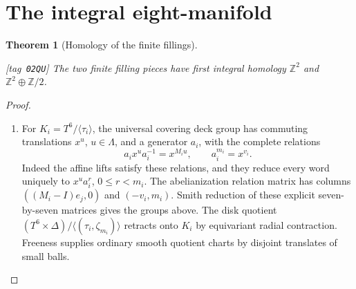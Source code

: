 \documentclass[11pt,a4paper]{article}
\numberwithin{equation}{section}
\newtheorem{theorem}{Theorem}[section]
\theoremstyle{definition}
\newcommand{\StatementRecord}[4]{{\upshape\footnotesize[tag~\texttt{#3}]}\enspace\ignorespaces}
\begin{document}
\section{The integral eight-manifold}\label{pub:V:sec-integral}






  






\begin{theorem}[Homology of the finite fillings]\hypertarget{tag-02QU}{}\label{night:P1.3}
\StatementRecord{night:P1.3}{proved}{02QU}{the definitions and constructions stated in the proof}
The two finite filling pieces have first integral homology
$\mathbb Z^2$ and $\mathbb Z^2\oplus\mathbb Z/2$.
\end{theorem}
\begin{proof}
\begin{enumerate}[label=\arabic*.]
\item For $K_i=T^6/\langle\tau_i\rangle$, the universal covering deck group
has commuting translations $x^u$, $u\in\Lambda$, and a generator $a_i$,
with the complete relations
\[
a_ix^ua_i^{-1}=x^{M_iu},\qquad a_i^{m_i}=x^{v_i}.
\]
Indeed the affine lifts satisfy these relations, and they reduce every
word uniquely to $x^ua_i^r$, $0\leq r<m_i$.
The abelianization relation matrix has columns
$((M_i-I)e_j,0)$ and $(-v_i,m_i)$.
Smith reduction of these explicit seven-by-seven matrices gives the
groups above.  The disk quotient
$(T^6\times\Delta)/\langle(\tau_i,\zeta_{m_i})\rangle$
retracts onto $K_i$ by equivariant radial contraction.  Freeness supplies
ordinary smooth quotient charts by disjoint translates of small balls.

\end{enumerate}
\end{proof}
\end{document}
